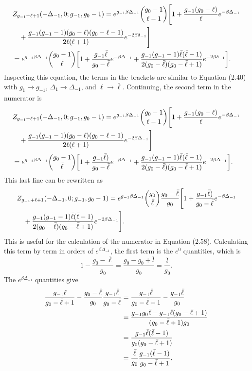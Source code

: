 \begin{align}
    &Z_{g_{-1}+\ell+1}(-\Delta_{-1},0;g_{-1},g_0-1)=e^{g_{-1}\beta\Delta_{-1}}{g_0-1 \choose \ell-1}\Biggr[1+\frac{g_{-1}(g_0-\ell)}{\ell}e^{-\beta\Delta_{-1}}\nonumber\\
    &\quad+\frac{g_{-1}(g_{-1}-1)(g_0-\ell)(g_0-\ell-1)}{2\ell(\ell+1)}e^{-2\beta\delta_{-1}}\Biggr]\nonumber\\
    &=e^{g_{-1}\beta\Delta_{-1}}{g_0-1 \choose \Bar{\ell}}\qty[1+\frac{g_{-1}\Bar{\ell}}{g_0-\bar{\ell}}e^{-\beta\Delta_{-1}}+\frac{g_{-1}(g_{-1}-1)\Bar{\ell}(\Bar{\ell}-1)}{2(g_0-\Bar{\ell})(g_0-\Bar{\ell}+1)}e^{-2\beta\delta_{-1}}].
\end{align}
Inspecting this equation, the terms in the brackets are similar to Equation (2.40) with $g_1\xrightarrow[]{}g_{-1}$, $\Delta_1\xrightarrow[]{}\Delta_{-1}$, and $\ell \xrightarrow[]{}\bar{\ell}$. Continuing, the second term in the numerator is
\begin{align}
    &Z_{g_{-1}+\ell+1}(-\Delta_{-1},0;g_{-1},g_0-1)=e^{g_{-1}\beta\Delta_{-1}}{g_0-1\choose \ell-1}\Biggr[1+\frac{g_{-1}(g_0-\ell)}{\ell}e^{-\beta\Delta_{-1}}\nonumber\\
    &\quad+\frac{g_{-1}(g_{-1}-1)(g_0-\ell)(g_0-\ell-1)}{2\ell(\ell+1)}e^{-2\beta\Delta_{-1}}\Biggr]\nonumber\\
    &=e^{g_{-1}\beta\Delta_{-1}}{g_0-1\choose \Bar{\ell}} \qty[1+\frac{g_{-1}\Bar{\ell})}{g_0-\Bar{\ell}}e^{-\beta\Delta_{-1}}+\frac{g_{-1}(g_{-1}-1)\Bar{\ell}(\Bar{\ell}-1)}{2(g_0-\Bar{\ell})(g_0-\Bar{\ell}+1)}e^{-2\beta\Delta_{-1}}].
\end{align}
This last line can be rewritten as 
\begin{align}
    &Z_{g_{-1}+\ell+1}(-\Delta_{-1},0;g_{-1},g_0-1)=e^{g_{-1}\beta\Delta_{-1}}{g_0\choose \Bar{\ell}} \frac{g_0-\bar{\ell}}{g_0} \Biggr[1+\frac{g_{-1}\Bar{\ell})}{g_0-\Bar{\ell}}e^{-\beta\Delta_{-1}}\nonumber\\
    &\quad+\frac{g_{-1}(g_{-1}-1)\Bar{\ell}(\Bar{\ell}-1)}{2(g_0-\Bar{\ell})(g_0-\Bar{\ell}+1)}e^{-2\beta\Delta_{-1}}\Biggr].
\end{align}
This is useful for the calculation of the numerator in Equation (2.58). Calculating this term by term in orders of $e^{\beta\Delta_{-1}}$, the first term is the $e^0$ quantities, which is 
\begin{equation}
    1-\frac{g_0-\bar{\ell}}{g_0}=\frac{g_0-g_0+\bar{l}}{g_0}=\frac{\bar{l}}{g_0}.
\end{equation}
The $e^{\beta\Delta_{-1}}$ quantities give
\begin{align}
    \frac{g_{-1}\ell}{g_0-\Bar{\ell}+1}-\frac{g_0-\Bar{\ell}}{g_0}\frac{g_{-1}\bar{\ell}}{g_0-\bar{\ell}}&=\frac{g_{-1}\bar{\ell}}{g_0-\bar{\ell}+1}-\frac{g_{-1}\bar{\ell}}{g_0}\nonumber\\
    &=\frac{g_{-1}g_0\bar{\ell}-g_{-1}\bar{\ell}(g_0-\bar{\ell}+1)}{(g_0-\bar{\ell}+1)g_0}\nonumber\\
    &=\frac{g_{-1}\bar{\ell}(\bar{\ell}-1)}{g_0(g_0-\bar{\ell}+1)}\nonumber\\
    &=\frac{\bar{\ell}}{g_0} \frac{g_{-1}(\bar{\ell}-1)}{g_0-\bar{\ell}+1}.
\end{align}
